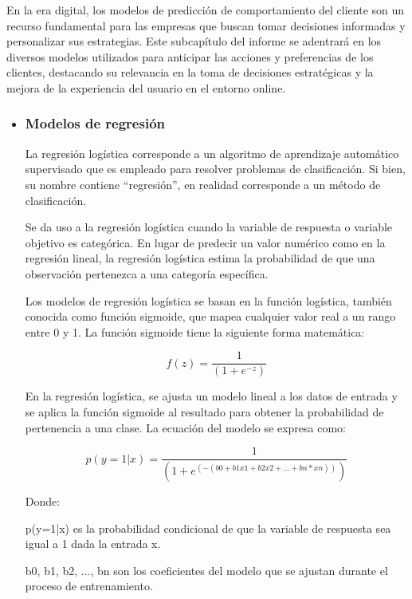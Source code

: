 En la era digital, los modelos de predicción de comportamiento del cliente son un recurso fundamental para las empresas que buscan tomar decisiones informadas y personalizar sus estrategias. Este subcapítulo del informe se adentrará en los diversos modelos utilizados para anticipar las acciones y preferencias de los clientes, destacando su relevancia en la toma de decisiones estratégicas y la mejora de la experiencia del usuario en el entorno online.

\begin{itemize}
    \item  \subsubsection{Modelos de regresión}
    \noindent
    La regresión logística corresponde a un algoritmo de aprendizaje automático supervisado que es empleado para resolver problemas de clasificación. Si bien, su nombre contiene “regresión”, en realidad corresponde a un método de clasificación.

    Se da uso a la regresión logística cuando la variable de respuesta o variable objetivo es categórica. En lugar de predecir un valor numérico como en la regresión lineal, la regresión logística estima la probabilidad de que una observación pertenezca a una categoría específica.

    Los modelos de regresión logística se basan en la función logística, también conocida como función sigmoide, que mapea cualquier valor real a un rango entre 0 y 1. La función sigmoide tiene la siguiente forma matemática:

    \begin{equation*}
        f(z) = \frac{1}{(1 + e^{-z})}
    \end{equation*}

    En la regresión logística, se ajusta un modelo lineal a los datos de entrada y se aplica la función sigmoide al resultado para obtener la probabilidad de pertenencia a una clase. La ecuación del modelo se expresa como:

    \begin{equation*}
        p(y=1|x) = \frac{1}{(1 + e^{(-(b0 + b1x1 + b2x2 + ... + bn*xn))})}
    \end{equation*}

    Donde:

    p(y=1|x) es la probabilidad condicional de que la variable de respuesta sea igual a 1 dada la entrada x.

    b0, b1, b2, ..., bn son los coeficientes del modelo que se ajustan durante el proceso de entrenamiento.


\end{itemize}
